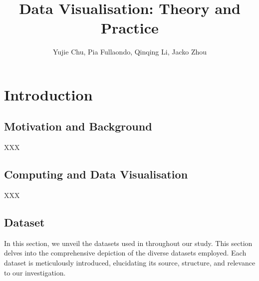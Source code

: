 \documentclass{article}\usepackage[]{graphicx}\usepackage[]{xcolor}
\title{Data Visualisation: Theory and Practice}
\author{Yujie Chu, Pia Fullaondo, Qinqing Li, Jacko Zhou}
\begin{document}
\maketitle 
\tableofcontents
\newpage 

\section{Introduction}

\subsection{Motivation and Background}
XXX

\subsection{Computing and Data Visualisation}
XXX

\subsection{Dataset}
In this section, we  unveil the datasets used in throughout our study. This section delves into the comprehensive depiction of the diverse datasets employed. Each dataset is meticulously introduced, elucidating its source, structure, and relevance to our investigation.
\end{document}
